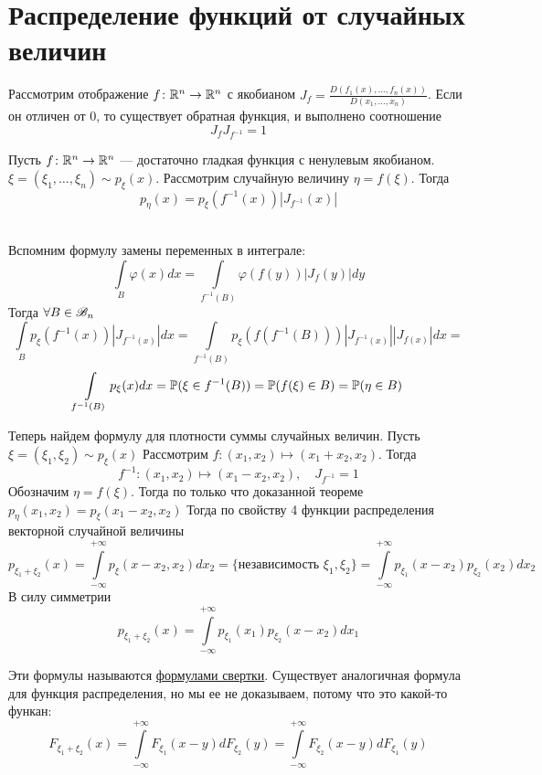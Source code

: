 \documentclass[../TV&MS.tex]{subfiles}
\begin{document}
    
\section{Распределение функций от случайных величин}
Рассмотрим отображение $f\colon \mathbb{R}^n \to \mathbb{R}^n$ с якобианом $J_f = \frac{D(f_1(x), \ldots, f_n(x))}{D(x_1, \ldots, x_n)}$.
Если он отличен от 0, то существует обратная функция, и выполнено соотношение
$$J_fJ_{f^{-1}} = 1$$

\begin{Th}
Пусть  $f\colon \mathbb{R}^n \to \mathbb{R}^n$ --- достаточно гладкая функция с ненулевым якобианом. $\xi = (\xi_1, \ldots, \xi_n) \sim p_\xi(x)$. Рассмотрим случайную величину $\eta = f(\xi)$. Тогда
$$p_\eta(x) = p_\xi(f^{-1}(x))|J_{f^{-1}}(x)|$$
\end{Th}
\begin{Proof} \\
Вспомним формулу замены переменных в интеграле:
$$\int\limits_B \varphi(x)dx = \int\limits_{f^{-1}(B)} \varphi(f(y))|J_f(y)|dy$$
Тогда $\forall B \in \mathscr{B}_n$
$$\int\limits_B p_\xi(f^{-1}(x))|J_{f^{-1}(x)}|dx = \int\limits_{f^{-1}(B)} p_\xi(f(f^{-1}(B)))|J_{f^{-1}(x)}||J_{f(x)}|dx =$$
$$ \int\limits_{f^{-1}(B)}p_\xi(x)dx = \mathbb{P}(\xi \in f^{-1}(B)) =\mathbb{P}(f(\xi) \in B) = \mathbb{P}(\eta \in B)$$
\end{Proof}

Теперь найдем формулу для плотности суммы случайных величин.
Пусть $\xi = (\xi_1, \xi_2) \sim p_\xi(x)$
Рассмотрим $f\colon (x_1, x_2) \mapsto (x_1 + x_2, x_2)$. Тогда $$f^{-1} \colon (x_1, x_2) \mapsto (x_1 - x_2, x_2), \quad J_{f^{-1}}=1$$
Обозначим $\eta = f(\xi)$. Тогда по только что доказанной теореме 
$p_\eta(x_1, x_2) = p_{\xi}(x_1 - x_2, x_2)$
Тогда по свойству 4 функции распределения векторной случайной величины
$$p_{\xi_1 + \xi_2}(x) = \int\limits_{-\infty}^{+\infty}p_\xi(x-x_2, x_2)dx_2 = \text{\{независимость $\xi_1, \xi_2$\}} = \int\limits_{-\infty}^{+\infty}p_{\xi_1}(x-x_2)p_{\xi_2}(x_2)dx_2$$
В силу симметрии 
$$p_{\xi_1 + \xi_2}(x) = \int\limits_{-\infty}^{+\infty}p_{\xi_1}(x_1)p_{\xi_2}(x - x_2)dx_1$$

Эти формулы называются \underline{формулами свертки}. Существует аналогичная формула для функция распределения, но мы ее не доказываем, потому что это какой-то функан:
$$F_{\xi_1 + \xi_2}(x) = \int\limits_{-\infty}^{+\infty}F_{\xi_1}(x-y)dF_{\xi_2}(y) = \int\limits_{-\infty}^{+\infty}F_{\xi_2}(x-y)dF_{\xi_1}(y)$$

\newpage
\end{document}
